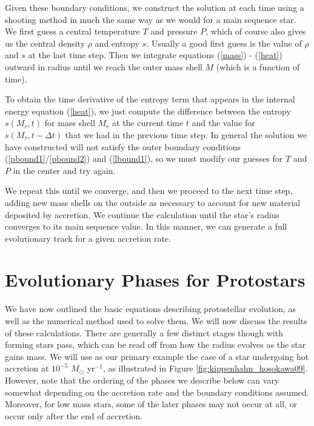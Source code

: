 Given these boundary conditions, we construct the solution at each time using a shooting method in much the same way as we would for a main sequence star. We first guess a central temperature $T$ and pressure $P$, which of course also gives us the central density $\rho$ and entropy $s$. Usually a good first guess is the value of $\rho$ and $s$ at the last time step. Then we integrate equations (\ref{mass}) - (\ref{heat}) outward in radius until we reach the outer mass shell $M$ (which is a function of time).

To obtain the time derivative of the entropy term that appears in the internal energy equation (\ref{heat}), we just compute the difference between the entropy $s(M_r,t)$ for mass shell $M_r$ at the current time $t$ and the value for $s(M_r,t-\Delta t)$ that we had in the previous time step. In general the solution we have constructed will not satisfy the outer boundary conditions (\ref{pbound1}/\ref{pbound2}) and (\ref{lbound1}), so we must modify our guesses for $T$ and $P$ in the center and try again.

We repeat this until we converge, and then we proceed to the next time step, adding new mass shells on the outside as necessary to account for new material deposited by accretion. We continue the calculation until the star's radius converges to its main sequence value. In this manner, we can generate a full evolutionary track for a given accretion rate.

\section{Evolutionary Phases for Protostars}

We have now outlined the basic equations describing protostellar evolution, as well as the numerical method used to solve them. We will now discuss the results of these calculations. There are generally a few distinct stages though with forming stars pass, which can be read off from how the radius evolves as the star gains mass. We will use as our primary example the case of a star undergoing hot accretion at $10^{-5}$ $M_\odot$ yr$^{-1}$, as illustrated in Figure \ref{fig:kippenhahn_hosokawa09}. However, note that the ordering of the phases we describe below can vary somewhat depending on the accretion rate and the boundary conditions assumed. Moreover, for low mass stars, some of the later phases may not occur at all, or occur only after the end of accretion.

